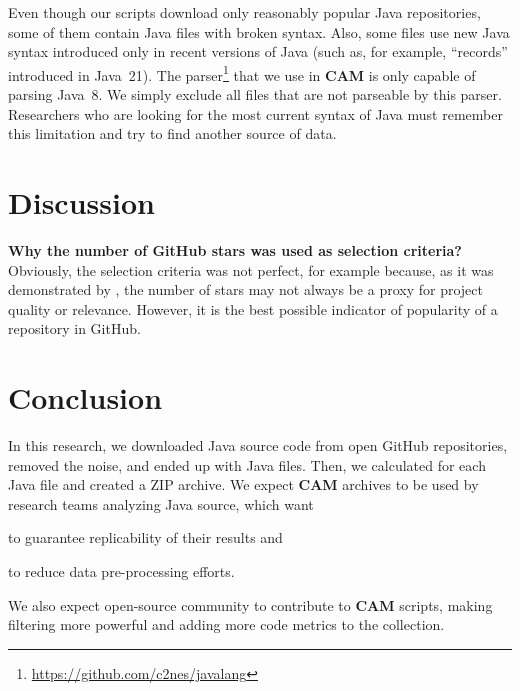 \documentclass[sigplan,nonacm,review,anonymous]{acmart}
\newcommand\cam{{\sffamily\bfseries CAM}}
\begin{document}
Even though our scripts download only reasonably popular Java repositories,
some of them contain Java files with broken syntax. Also, some files use
new Java syntax introduced only in recent versions of Java (such as,
for example, ``records'' introduced in Java~21).
The parser\footnote{\url{https://github.com/c2nes/javalang}} that we use
in \cam{} is only capable of parsing Java~8. We simply exclude all files
that are not parseable by this parser. Researchers who are looking for
the most current syntax of Java must remember this limitation and try
to find another source of data.

\section{Discussion}\label{sec:discussion}

\textbf{Why the number of GitHub stars was used as selection criteria?}
Obviously, the selection criteria was not perfect, for example because,
as it was demonstrated by \citet{munaiah2017curating}, the number of stars
may not always be a proxy for project quality or relevance. However,
it is the best possible indicator of popularity of a repository in GitHub.

\section{Conclusion}\label{sec:conclusion}

In this research, we downloaded Java source code from
\unskip{}
open GitHub repositories, removed the noise, and ended up with
\unskip{} Java files.
Then, we calculated
\unskip{}
for each Java file and created a ZIP archive.
We expect \cam{} archives to be used by research teams analyzing Java source, which want
\begin{inparaenum}[(a)]
\item to guarantee replicability of their results
and
\item to reduce data pre-processing efforts.
\end{inparaenum}
We also expect open-source community to contribute to \cam{} scripts,
making filtering more powerful and adding more code metrics to the collection.



\end{document}
